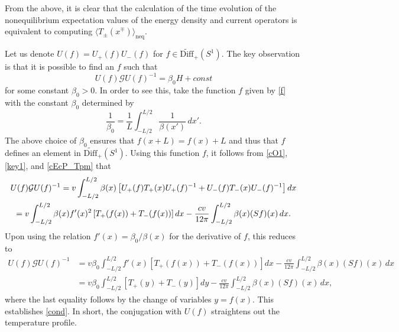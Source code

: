 \documentclass[12pt,a4paper]{article}
\newcommand{\SL}{S^1}
\newcommand{\wDiff}{\widetilde{\mathrm{Diff}}}
\newcommand{\cG}{\mathcal{G}}
\theoremstyle{definition}
\theoremstyle{remark}
\begin{document}
From the above, it is clear that the calculation of the time evolution of the nonequilibrium expectation values of the energy density and current operators is equivalent to computing $\langle T_{\pm}(x^\mp)\rangle_{\text{neq}}$.

Let us denote $U(f) = U_{+}(f)U_{-}(f)$ for $f\in\wDiff_+(\SL)$. 
The key observation is that it is possible to find an $f$ such that
%
\begin{equation} 
\label{cond} 
U(f)\cG U(f)^{-1} = \beta_0 H + const 
\end{equation}
%
for some constant $\beta_0 > 0$.
In order to see this, take the function $f$ given by \eqref{f} with the constant $\beta_0$ determined by
%
\begin{equation}
\label{beta0}
\frac{1}{\beta_0}=\frac{1}{L}\int_{-L/2}^{L/2}\frac{1}{\beta(x')} \, dx'.
\end{equation}
%
The above choice of $\beta_0$ ensures that $f(x+L)=f(x)+L$ and thus that $f$ defines an element in $\wDiff_+(\SL)$.
Using this function $f$, it follows from \eqref{cO1}, \eqref{key1}, and \eqref{cEcP_Tpm} that
%
\begin{multline}
U(f) \cG U(f)^{-1}
= v \int_{-L/2}^{L/2}\beta(x)
		\left[ U_{+}(f)T_{+}(x)U_{+}(f)^{-1} + U_{-}(f)T_{-}(x)U_{-}(f)^{-1} \right] dx \cr
= v \int_{-L/2}^{L/2} \beta(x)f'(x)^2 \left[ T_{+}(f(x)) + T_{-}(f(x)) \right] dx
		- \frac{cv}{12\pi} \int_{-L/2}^{L/2} \beta(x) (Sf)(x) \, dx.
\end{multline}
%
Upon using the relation $f'(x) = \beta_0/\beta(x)$ for the derivative of $f$, this reduces to
%
\begin{align}
U(f)\cG U(f)^{-1}
& = v\beta_0 \int_{-L/2}^{L/2}f'(x) \left[ T_{+}(f(x)) + T_{-}(f(x)) \right] dx
  	- \frac{cv}{12\pi} \int_{-L/2}^{L/2} \beta(x)(Sf)(x) \, dx \nonumber \\
& = v\beta_0 \int_{-L/2}^{L/2} \left[ T_{+}(y) + T_{-}(y) \right] dy
		- \frac{cv}{12\pi} \int_{-L/2}^{L/2} \beta(x) (Sf)(x) \, dx,
\end{align}
%
where the last equality follows by the change of variables $y = f(x)$.
This establishes \eqref{cond}.
In short, the conjugation with $U(f)$ straightens out the temperature profile.
\end{document}
